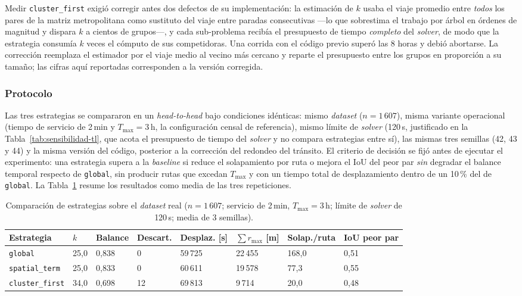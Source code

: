 Medir \texttt{cluster\_first} exigió corregir antes dos defectos de su
implementación: la estimación de $k$ usaba el viaje promedio entre
\textit{todos} los pares de la matriz metropolitana como sustituto del viaje
entre paradas consecutivas ---lo que sobrestima el trabajo por árbol en órdenes
de magnitud y dispara $k$ a cientos de grupos---, y cada sub-problema recibía el
presupuesto de tiempo \textit{completo} del \textit{solver}, de modo que la estrategia
consumía $k$ veces el cómputo de sus competidoras. Una corrida con el código
previo superó las 8 horas y debió abortarse. La corrección reemplaza el
estimador por el viaje medio al vecino más cercano y reparte el presupuesto
entre los grupos en proporción a su tamaño; las cifras aquí reportadas
corresponden a la versión corregida.

\subsubsection*{Protocolo}

Las tres estrategias se compararon en un \textit{head-to-head} bajo condiciones
idénticas: mismo \textit{dataset} ($n = 1\,607$), misma variante operacional
(tiempo de servicio de 2\,min y $T_{\max} = 3$\,h, la configuración censal de
referencia), mismo límite de \textit{solver} (120\,s, justificado en la
Tabla~\ref{tab:sensibilidad-tl}, que acota el presupuesto de tiempo del \textit{solver} y
no compara estrategias entre sí), las mismas tres semillas (42, 43 y 44) y la
misma versión del código, posterior a la corrección del redondeo del tránsito.
El criterio de decisión se fijó antes de ejecutar el experimento: una estrategia
supera a la \textit{baseline} si reduce el solapamiento por ruta o mejora el IoU
del peor par \textit{sin} degradar el balance temporal respecto de
\texttt{global}, sin producir rutas que excedan $T_{\max}$ y con un tiempo total
de desplazamiento dentro de un 10\,\% del de \texttt{global}. La
Tabla~\ref{tab:estrategias} resume los resultados como media de las tres
repeticiones.

\begin{table}[H]
  \centering
  \caption{Comparación de estrategias sobre el \textit{dataset} real ($n=1\,607$; servicio de 2\,min, $T_{\max}=3$\,h; límite de \textit{solver} de 120\,s; media de 3 semillas).}
  \label{tab:estrategias}
  \small
  \begin{tabularx}{\textwidth}{lXXXXXXX}
    \toprule
    Estrategia & $k$ & Balance & Descart. & Des\-plaz. [s] & $\sum r_{\max}$ [m] & Solap.\slash ruta & IoU peor par \\
    \midrule
    \texttt{global}        & 25{,}0 & 0{,}838 & 0  & 59\,725 & 22\,455 & 168{,}0 & 0{,}51 \\
    \texttt{spatial\_term} & 25{,}0 & 0{,}833 & 0  & 60\,611 & 19\,578 & 77{,}3  & 0{,}55 \\
    \texttt{cluster\_first}& 34{,}0 & 0{,}698 & 12 & 69\,813 & 9\,714  & 20{,}0  & 0{,}48 \\
    \bottomrule
  \end{tabularx}
\end{table}

